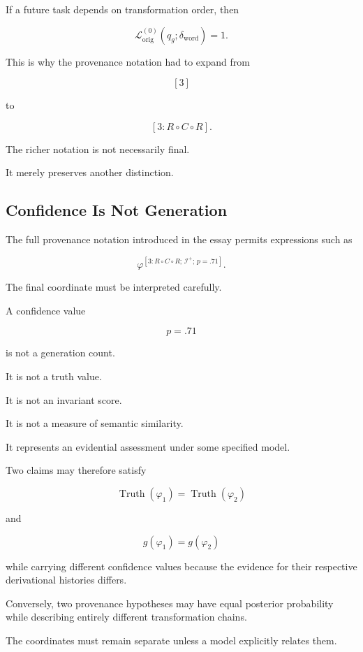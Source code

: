 \documentclass[
  11pt,
  a4paper,
  DIV=12,
  BCOR=0mm,
  parskip=half-
]{scrartcl}
\newcommand{\Inv}{\mathcal I}
\newcommand{\lossorig}{%
  \mathscr L_{\mathrm{orig}}%
}
\newcommand{\Truth}{\operatorname{Truth}}
\theoremstyle{definition}
\theoremstyle{plain}
\theoremstyle{remark}
\begin{document}
If a future task depends on transformation order, then

\[
  \lossorig^{(0)}(q_g;\delta_{\mathrm{word}})=1.
\]

This is why the provenance notation had to expand from

\[
  [3]
\]

to

\[
  [3:R\circ C\circ R].
\]

The richer notation is not necessarily final.

It merely preserves another distinction.


\subsection{Confidence Is Not Generation}
\label{app:confidence-generation}

The full provenance notation introduced in the essay permits expressions such
as

\[
  \varphi^{[3:R\circ C\circ R;\,\Inv^+;\,p=.71]}.
\]

The final coordinate must be interpreted carefully.

A confidence value

\[
  p=.71
\]

is not a generation count.

It is not a truth value.

It is not an invariant score.

It is not a measure of semantic similarity.

It represents an evidential assessment under some specified model.

Two claims may therefore satisfy

\[
  \Truth(\varphi_1)=\Truth(\varphi_2)
\]

and

\[
  g(\varphi_1)=g(\varphi_2)
\]

while carrying different confidence values because the evidence for their
respective derivational histories differs.

Conversely, two provenance hypotheses may have equal posterior probability
while describing entirely different transformation chains.

The coordinates must remain separate unless a model explicitly relates them.
\end{document}
